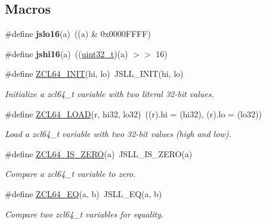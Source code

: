 \subsection*{Macros}
\begin{DoxyCompactItemize}
\item 
\hypertarget{group__zcl__64_ga82d69c4b59ebfde1f784f7d30246e575}{\#define {\bfseries jslo16}(a)~((a) \& 0x0000\-F\-F\-F\-F)}\label{group__zcl__64_ga82d69c4b59ebfde1f784f7d30246e575}

\item 
\hypertarget{group__zcl__64_ga50ea98cec1c7c8393b65115d0bd756f9}{\#define {\bfseries jshi16}(a)~((\hyperlink{group__hal__dos_ga09a1e304d66d35dd47daffee9731edaa}{uint32\-\_\-t})(a) $>$$>$ 16)}\label{group__zcl__64_ga50ea98cec1c7c8393b65115d0bd756f9}

\item 
\#define \hyperlink{group__zcl__64_ga8e855e53988a32f4428ceacce4f9870c}{Z\-C\-L64\-\_\-\-I\-N\-I\-T}(hi, lo)~J\-S\-L\-L\-\_\-\-I\-N\-I\-T(hi, lo)
\begin{DoxyCompactList}\small\item\em Initialize a zcl64\-\_\-t variable with two literal 32-\/bit values. \end{DoxyCompactList}\item 
\#define \hyperlink{group__zcl__64_ga899413577d0a7e9b641cc5c309b08aeb}{Z\-C\-L64\-\_\-\-L\-O\-A\-D}(r, hi32, lo32)~((r).hi = (hi32), (r).lo = (lo32))
\begin{DoxyCompactList}\small\item\em Load a zcl64\-\_\-t variable with two 32-\/bit values (high and low). \end{DoxyCompactList}\item 
\#define \hyperlink{group__zcl__64_gad0e4c484d689dee3c5f1302fc80aef3e}{Z\-C\-L64\-\_\-\-I\-S\-\_\-\-Z\-E\-R\-O}(a)~J\-S\-L\-L\-\_\-\-I\-S\-\_\-\-Z\-E\-R\-O(a)
\begin{DoxyCompactList}\small\item\em Compare a zcl64\-\_\-t variable to zero. \end{DoxyCompactList}\item 
\#define \hyperlink{group__zcl__64_ga329900843c1e59c30b4bdff95ee594bd}{Z\-C\-L64\-\_\-\-E\-Q}(a, b)~J\-S\-L\-L\-\_\-\-E\-Q(a, b)
\begin{DoxyCompactList}\small\item\em Compare two zcl64\-\_\-t variables for equality. \end{DoxyCompactList}\item 

\end{DoxyCompactItemize}
